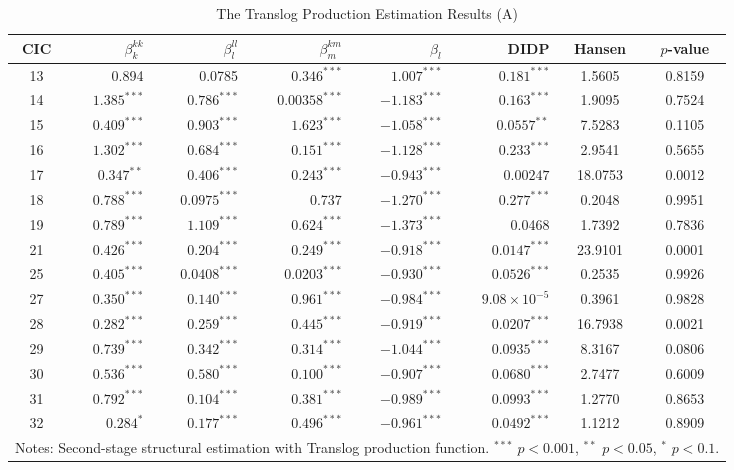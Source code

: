\documentclass[11pt,a4paper]{article}
\begin{document}
\begin{table}[htbp]
\centering
\caption{The Translog Production Estimation Results (A)}
\label{tab:translog_a}
\begin{tabular}{crrrrrcc}
\toprule
CIC & $\beta_{k}^{kk}$ & $\beta_{l}^{ll}$ & $\beta_{m}^{km}$ & $\beta_{l}$ & DIDP & Hansen & $p$-value \\
\midrule
13 & 0.894 & 0.0785 & $0.346^{***}$ & $1.007^{***}$ & $0.181^{***}$ & 1.5605 & 0.8159 \\
14 & $1.385^{***}$ & $0.786^{***}$ & $0.00358^{***}$ & $-1.183^{***}$ & $0.163^{***}$ & 1.9095 & 0.7524 \\
15 & $0.409^{***}$ & $0.903^{***}$ & $1.623^{***}$ & $-1.058^{***}$ & $0.0557^{**}$ & 7.5283 & 0.1105 \\
16 & $1.302^{***}$ & $0.684^{***}$ & $0.151^{***}$ & $-1.128^{***}$ & $0.233^{***}$ & 2.9541 & 0.5655 \\
17 & $0.347^{**}$ & $0.406^{***}$ & $0.243^{***}$ & $-0.943^{***}$ & $0.00247$ & 18.0753 & 0.0012 \\
18 & $0.788^{***}$ & $0.0975^{***}$ & 0.737 & $-1.270^{***}$ & $0.277^{***}$ & 0.2048 & 0.9951 \\
19 & $0.789^{***}$ & $1.109^{***}$ & $0.624^{***}$ & $-1.373^{***}$ & 0.0468 & 1.7392 & 0.7836 \\
21 & $0.426^{***}$ & $0.204^{***}$ & $0.249^{***}$ & $-0.918^{***}$ & $0.0147^{***}$ & 23.9101 & 0.0001 \\
25 & $0.405^{***}$ & $0.0408^{***}$ & $0.0203^{***}$ & $-0.930^{***}$ & $0.0526^{***}$ & 0.2535 & 0.9926 \\
27 & $0.350^{***}$ & $0.140^{***}$ & $0.961^{***}$ & $-0.984^{***}$ & $9.08\times10^{-5}$ & 0.3961 & 0.9828 \\
28 & $0.282^{***}$ & $0.259^{***}$ & $0.445^{***}$ & $-0.919^{***}$ & $0.0207^{***}$ & 16.7938 & 0.0021 \\
29 & $0.739^{***}$ & $0.342^{***}$ & $0.314^{***}$ & $-1.044^{***}$ & $0.0935^{***}$ & 8.3167 & 0.0806 \\
30 & $0.536^{***}$ & $0.580^{***}$ & $0.100^{***}$ & $-0.907^{***}$ & $0.0680^{***}$ & 2.7477 & 0.6009 \\
31 & $0.792^{***}$ & $0.104^{***}$ & $0.381^{***}$ & $-0.989^{***}$ & $0.0993^{***}$ & 1.2770 & 0.8653 \\
32 & $0.284^{*}$ & $0.177^{***}$ & $0.496^{***}$ & $-0.961^{***}$ & $0.0492^{***}$ & 1.1212 & 0.8909 \\
\bottomrule
\multicolumn{8}{p{\textwidth}}{\footnotesize Notes: Second-stage structural estimation with Translog production function. $^{***}$ $p<0.001$, $^{**}$ $p<0.05$, $^{*}$ $p<0.1$.}
\end{tabular}
\end{table}
\end{document}
